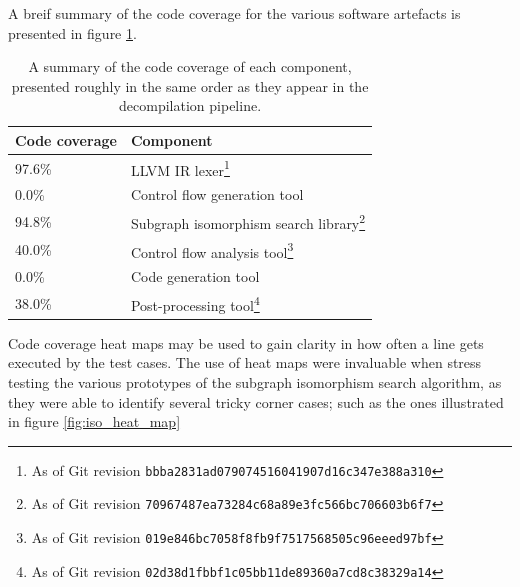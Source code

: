 A breif summary of the code coverage for the various software artefacts is presented in figure \ref{tbl:code_coverage_summary}.

\begin{savenotes}
	\begin{table}[htbp]
		\begin{center}
			\begin{tabular}{|l|l|}
				\hline
				Code coverage & Component \\
				\hline
				97.6\% & LLVM IR lexer\footnote{As of Git revision \texttt{bbba2831ad079074516041907d16c347e388a310}} \\
				0.0\% & Control flow generation tool \\
				94.8\% & Subgraph isomorphism search library\footnote{As of Git revision \texttt{70967487ea73284c68a89e3fc566bc706603b6f7}} \\
				40.0\% & Control flow analysis tool\footnote{As of Git revision \texttt{019e846bc7058f8fb9f7517568505c96eeed97bf}} \\
				0.0\% & Code generation tool \\
				38.0\% & Post-processing tool\footnote{As of Git revision \texttt{02d38d1fbbf1c05bb11de89360a7cd8c38329a14}} \\
				\hline
			\end{tabular}
		\end{center}
		\caption{A summary of the code coverage of each component, presented roughly in the same order as they appear in the decompilation pipeline.}
		\label{tbl:code_coverage_summary}
	\end{table}
\end{savenotes}

Code coverage heat maps may be used to gain clarity in how often a line gets executed by the test cases. The use of heat maps were invaluable when stress testing the various prototypes of the subgraph isomorphism search algorithm, as they were able to identify several tricky corner cases; such as the ones illustrated in figure \ref{fig:iso_heat_map}


